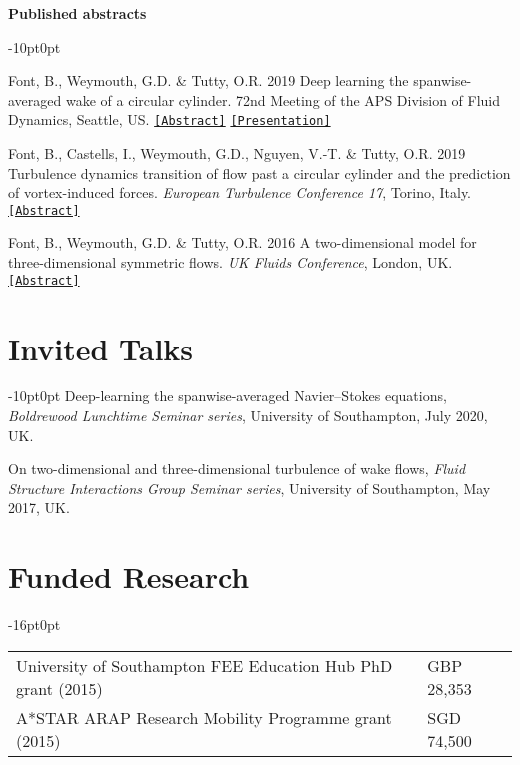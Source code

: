 \documentclass[line]{res}
\newenvironment{p}
  {\begin{adjustwidth}{-10pt}{0pt}}
  {\end{adjustwidth}}
\newenvironment{p3}
  {\begin{adjustwidth}{-16pt}{0pt}
  \vspace{3pt}}
  {\end{adjustwidth}}
\begin{document}
\begin{resume}
\hspace{-1cm}\textbf{Published abstracts}\vspace{0.25cm}
\begin{p}
\begin{etaremune}[leftmargin=-2pt,parsep=5pt]
\item Font, B., Weymouth, G.D.  \&  Tutty, O.R. 2019  Deep learning the spanwise-averaged wake of a circular cylinder. 72nd Meeting of the APS Division of Fluid Dynamics, Seattle, US. \href{https://meetings.aps.org/Meeting/DFD19/Session/L17.5}{\texttt{[Abstract]}} \href{https://github.com/b-fg/APS2019}{\texttt{[Presentation]}}
\item Font, B., Castells, I., Weymouth, G.D., Nguyen, V.-T.  \&  Tutty, O.R. 2019  Turbulence dynamics transition of flow past a circular cylinder and the prediction of vortex-induced forces. \textit{European Turbulence Conference 17}, Torino, Italy. \href{https://etc17.fyper.com/program/show_slot/41}{\texttt{[Abstract]}}
\item Font, B., Weymouth, G.D.  \&  Tutty, O.R. 2016  A two-dimensional model for three-dimensional symmetric flows. \textit{UK Fluids Conference}, London, UK. \href{https://www.imperial.ac.uk/media/imperial-college/faculty-of-engineering/aeronautics/UK-Fluids-Conference-2016-booklet.pdf}{\texttt{[Abstract]}}
\end{etaremune}
\end{p}

\section{Invited Talks}\vspace{0.5cm}
\begin{p}
Deep-learning the spanwise-averaged Navier--Stokes equations, \textit{Boldrewood Lunchtime Seminar series}, University of Southampton, July 2020, UK.

On two-dimensional and three-dimensional turbulence of wake flows, \textit{Fluid Structure Interactions Group Seminar series}, University of Southampton, May 2017, UK.
\end{p}

\section{Funded Research}\vspace{0.5cm}
\begin{p3}
\begin{tabular}{p{} >{\raggedleft\arraybackslash}p{}}
University of Southampton FEE Education Hub PhD grant (2015) & GBP 28,353\\
A*STAR ARAP Research Mobility Programme grant (2015) & SGD 74,500
\end{tabular}
\end{p3}


\end{resume}
\end{document}
